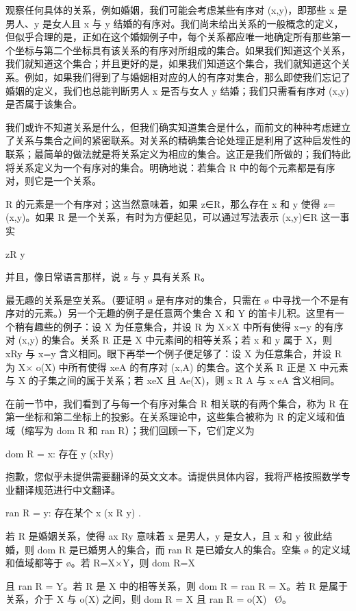 \documentclass[12pt,a4paper]{ctexbook}
\theoremstyle{definition}
\theoremstyle{remark}
\begin{document}
观察任何具体的关系，例如婚姻，我们可能会考虑某些有序对 (x,y)，即那些 x 是男人、y 是女人且 x 与 y 结婚的有序对。我们尚未给出关系的一般概念的定义，但似乎合理的是，正如在这个婚姻例子中，每个关系都应唯一地确定所有那些第一个坐标与第二个坐标具有该关系的有序对所组成的集合。如果我们知道这个关系，我们就知道这个集合；并且更好的是，如果我们知道这个集合，我们就知道这个关系。例如，如果我们得到了与婚姻相对应的人的有序对集合，那么即使我们忘记了婚姻的定义，我们也总能判断男人 x 是否与女人 y 结婚；我们只需看有序对 (x,y) 是否属于该集合。

我们或许不知道关系是什么，但我们确实知道集合是什么，而前文的种种考虑建立了关系与集合之间的紧密联系。对关系的精确集合论处理正是利用了这种启发性的联系；最简单的做法就是将关系定义为相应的集合。这正是我们所做的；我们特此将关系定义为一个有序对的集合。明确地说：若集合 R 中的每个元素都是有序对，则它是一个关系。

R 的元素是一个有序对；这当然意味着，如果 z∈R，那么存在 x 和 y 使得 z=(x,y)。如果 R 是一个关系，有时为方便起见，可以通过写法表示 (x,y)∈R 这一事实

zR y

并且，像日常语言那样，说 z 与 y 具有关系 R。

最无趣的关系是空关系。（要证明 ø 是有序对的集合，只需在 ø 中寻找一个不是有序对的元素。）另一个无趣的例子是任意两个集合 X 和 Y 的笛卡儿积。这里有一个稍有趣些的例子：设 X 为任意集合，并设 R 为 X×X 中所有使得 x=y 的有序对 (x,y) 的集合。关系 R 正是 X 中元素间的相等关系；若 x 和 y 属于 X，则 xRy 与 x=y 含义相同。眼下再举一个例子便足够了：设 X 为任意集合，并设 R 为 X× o(X) 中所有使得 xeA 的有序对 (x,A) 的集合。这个关系 R 正是 X 中元素与 X 的子集之间的属于关系；若 xeX 且 Ae(X)，则 x R A 与 x eA 含义相同。

在前一节中，我们看到了与每一个有序对集合 R 相关联的有两个集合，称为 R 在第一坐标和第二坐标上的投影。在关系理论中，这些集合被称为 R 的定义域和值域（缩写为 dom R 和 ran R）；我们回顾一下，它们定义为

dom R = {x: 存在 y (xRy)}

抱歉，您似乎未提供需要翻译的英文文本。请提供具体内容，我将严格按照数学专业翻译规范进行中文翻译。

ran R ={ y: 存在某个 x (x R y) }.

若 R 是婚姻关系，使得 ax Ry 意味着 x 是男人，y 是女人，且 x 和 y 彼此结婚，则 dom R 是已婚男人的集合，而 ran R 是已婚女人的集合。空集 ø 的定义域和值域都等于 ø。若 R=X×Y，则 dom R=X

且 ran R = Y。若 R 是 X 中的相等关系，则 dom R = ran R = X。若 R 是属于关系，介于 X 与 o(X) 之间，则 dom R = X 且 ran R = o(X) \ {Ø}。
\end{document}
